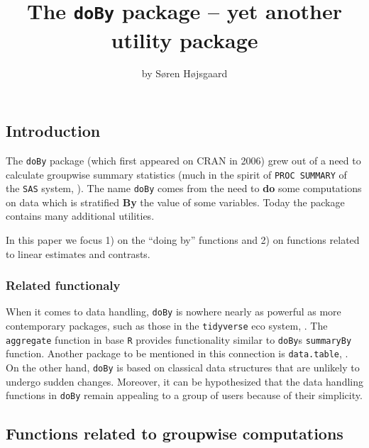 \title{The \texttt{doBy} package -- yet another utility package}
\author{by Søren Højsgaard}

\maketitle


\hypertarget{introduction}{%
\subsection{Introduction}\label{introduction}}

The \texttt{doBy} package (which first appeared on CRAN in 2006) grew
out of a need to calculate groupwise summary statistics (much in the
spirit of \texttt{PROC\ SUMMARY} of the \texttt{SAS} system,
\citep{procsummary}). The name \texttt{doBy} comes from the need to
\textbf{do} some computations on data which is stratified \textbf{By}
the value of some variables. Today the package contains many additional
utilities.

In this paper we focus 1) on the ``doing by'' functions and 2) on
functions related to linear estimates and contrasts.

\hypertarget{related-functionaly}{%
\subsubsection{Related functionaly}\label{related-functionaly}}

When it comes to data handling, \texttt{doBy} is nowhere nearly as
powerful as more contemporary packages, such as those in the
\texttt{tidyverse} eco system, \citep{tidyverse}. The \texttt{aggregate}
function in base \texttt{R} provides functionality similar to
\texttt{doBy}s \texttt{summaryBy} function. Another package to be
mentioned in this connection is \texttt{data.table}, \citet{data.table}.
On the other hand, \texttt{doBy} is based on classical data structures
that are unlikely to undergo sudden changes. Moreover, it can be
hypothesized that the data handling functions in \texttt{doBy} remain
appealing to a group of users because of their simplicity.

\hypertarget{functions-related-to-groupwise-computations}{%
\subsection{Functions related to groupwise
computations}\label{functions-related-to-groupwise-computations}}

